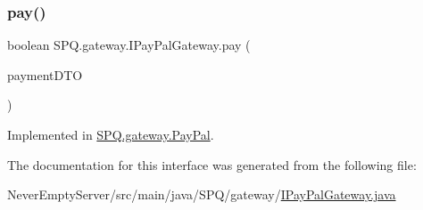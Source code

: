 \subsubsection{\texorpdfstring{pay()}{pay()}}
{\footnotesize\ttfamily boolean S\+P\+Q.\+gateway.\+I\+Pay\+Pal\+Gateway.\+pay (\begin{DoxyParamCaption}\item[{\mbox{\hyperlink{class_s_p_q_1_1dto_1_1_payment_d_t_o}{Payment\+D\+TO}}}]{payment\+D\+TO }\end{DoxyParamCaption})}



Implemented in \mbox{\hyperlink{class_s_p_q_1_1gateway_1_1_pay_pal_a4f12e3d9fd7cc1ebf54e885df464f1d4}{S\+P\+Q.\+gateway.\+Pay\+Pal}}.



The documentation for this interface was generated from the following file\+:\begin{DoxyCompactItemize}
\item 
Never\+Empty\+Server/src/main/java/\+S\+P\+Q/gateway/\mbox{\hyperlink{_i_pay_pal_gateway_8java}{I\+Pay\+Pal\+Gateway.\+java}}\end{DoxyCompactItemize}
